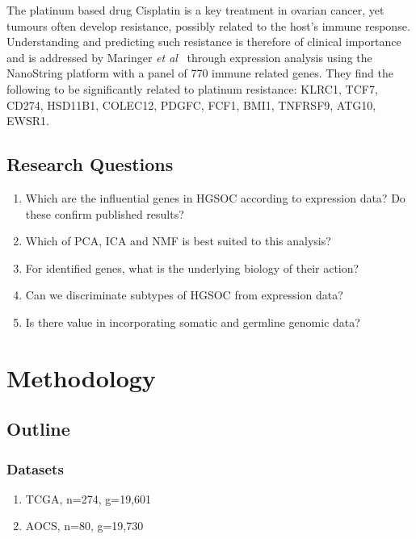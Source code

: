 \documentclass[draft, tikz, 12pt,a4paper,oneside,fleqn]{article}
\newcommand{\etal}{{\em et al\/}}
\begin{document}
The platinum based drug Cisplatin is a key treatment in ovarian cancer, yet tumours often develop resistance, possibly related to the host's immune response.  Understanding and predicting such resistance is therefore of clinical importance and is addressed by Maringer \etal\ \cite{Mairinger2019} through expression analysis using the NanoString platform with a panel of 770 immune related genes.   They find the following to be significantly related to platinum resistance: KLRC1, TCF7, CD274, HSD11B1, COLEC12, PDGFC, FCF1, BMI1, TNFRSF9, ATG10, EWSR1.

\subsection{Research Questions}
\begin{enumerate}
\item
Which are the influential genes in HGSOC according
to expression data? Do these confirm published
results?
\item
Which of PCA, ICA and NMF is best suited to this
analysis?
\item
For identified genes, what is the underlying biology of
their action?
\item
Can we discriminate subtypes of HGSOC from
expression data?
\item
Is there value in incorporating somatic and germline
genomic data?
\end{enumerate}


\section{Methodology}

\subsection{Outline}

\subsubsection{Datasets}
\begin{enumerate}
\item TCGA, n=274, g=19,601
\item AOCS, n=80, g=19,730
\end{enumerate}
\end{document}
